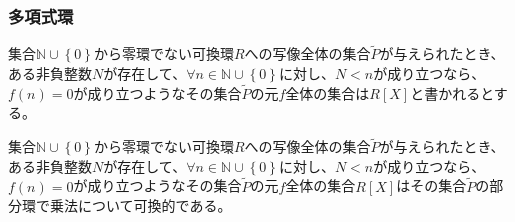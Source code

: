 \documentclass[dvipdfmx]{jsarticle}
\begin{document}
\subsubsection{多項式環}%
\begin{dfn}
集合$\mathbb{N} \cup \left\{ 0 \right\}$から零環でない可換環$R$への写像全体の集合$\widetilde{P}$が与えられたとき、ある非負整数$N$が存在して、$\forall n \in \mathbb{N} \cup \left\{ 0 \right\}$に対し、$N < n$が成り立つなら、$f(n) = 0$が成り立つようなその集合$\widetilde{P}$の元$f$全体の集合は$R[ X]$と書かれるとする。
\end{dfn}
\begin{thm}\label{3.3.3.4}
集合$\mathbb{N} \cup \left\{ 0 \right\}$から零環でない可換環$R$への写像全体の集合$\widetilde{P}$が与えられたとき、ある非負整数$N$が存在して、$\forall n \in \mathbb{N} \cup \left\{ 0 \right\}$に対し、$N < n$が成り立つなら、$f(n) = 0$が成り立つようなその集合$\widetilde{P}$の元$f$全体の集合$R[ X]$はその集合$\widetilde{P}$の部分環で乗法について可換的である。
\end{thm}
\end{document}
